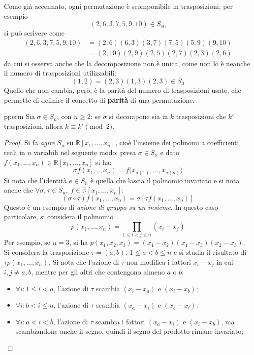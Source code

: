 \documentclass[11pt, a4paper]{scrartcl}
\theoremstyle{definition}
\numberwithin{esempio}{section}
\theoremstyle{definition}
\numberwithin{obs}{section}
\numberwithin{nota}{section}
\numberwithin{equation}{subsection}
\begin{document}
\noindent Come gi\`a accennato, ogni permutazione \`e scomponibile in trasposizioni; per esempio
\[
	(2,6,3,7,5,9,10) \in S_{10}
\] 
si pu\`o scrivere come 
\[
	\begin{split}
		(2,6,3,7,5,9,10) &= (2,6)(6,3)(3,7)(7,5)(5,9)(9,10)\\
				 &= (2,10)(2,9)(2,5)(2,7)(2,3)(2,6)
	\end{split}
\] 
da cui si osserva anche che la decomposizione non \`e unica, come non lo \`e neanche il numero di trasposizioni utilizzabili:
\[
	(1,2) = (2,3)(1,3)(2,3) \in S_3
\] 
Quello che non cambia, per\`o, \`e la parit\`a del numero di trasposizioni usate, che permette di definire il concetto di \textbf{parit\`a} di una permutazione.
\begin{teorema}
	{}{pperm}
	Sia $\sigma \in S_n$, con $n\ge 2$; se $\sigma $ si decompone sia in $k$ trasposizioni che $k'$ trasposizioni, allora $k\equiv k' \pmod{2} $.
	\begin{proof}
		Si fa \textit{agire} $S_n$ su $\mathbb{R}[x_1,\ldots,x_n]$, cio\`e l'insieme dei polinomi a coefficienti reali in $n$ variabili nel seguente modo: presa $\sigma \in S_n$ e dato $f(x_1,\ldots,x_n)\in \mathbb{R}[x_1,\ldots,x_n]$ si ha:
		\[
		\sigma f(x_1,..,x_n) = f\big(x_{\sigma (1)} ,\ldots, x_{\sigma (n)} \big)
		\] 
		Si nota che l'identit\`a $e\in S_n$ \`e quella che lascia il polinomio invariato e si nota anche che $\forall \sigma ,\tau  \in S_n,\ f \in \mathbb{R}[x_1,\ldots,x_n]$:
		\[
			(\sigma \circ \tau )f(x_1,\ldots,x_n)= \sigma \left[ \tau f(x_1,\ldots,x_n) \right] 
		\] 
		Questo \`e un esempio di \textit{azione di gruppo su un insieme}.
		In questo caso particolare, si considera il polinomio
		\[
		p(x_1,\ldots,x_n) = \prod_{1\le i<j\le n} (x_i- x_j)
		\] 
		Per esempio, se $n=3$, si ha $p(x_1,x_2,x_3) = (x_1-x_2)(x_1-x_3) (x_2-x_3)$.
		Si considera la trasposizione $\tau  = (a,b), \ 1\le a<b\le n$ e si studia il risultato di $\tau  p(x_1,\ldots,x_n)$.
		Si nota che l'azione di $\tau $ non modifica i fattori $x_i- x_j$ in cui $i,j\neq a,b$, mentre per gli altri che contengono almeno $a$ o $b$:
		\begin{itemize}
			\item $\forall i : 1\le i<a$, l'azione di $\tau $ scambia $(x_i-x_a)$ e $(x_i-x_b)$;
			\item $\forall i : b<i \le n$, l'azione di $\tau $ scambia $(x_a-x_i)$ e $(x_b-x_i)$;
			\item $\forall i : a<i<b$, l'azione di $\tau $ scambia i fattori $(x_a-x_i)$ e $(x_i-x_b)$, ma scambiandone anche il segno, quindi il segno del prodotto rimane invariato;

\end{itemize}
\end{proof}
\end{teorema}
\end{document}
